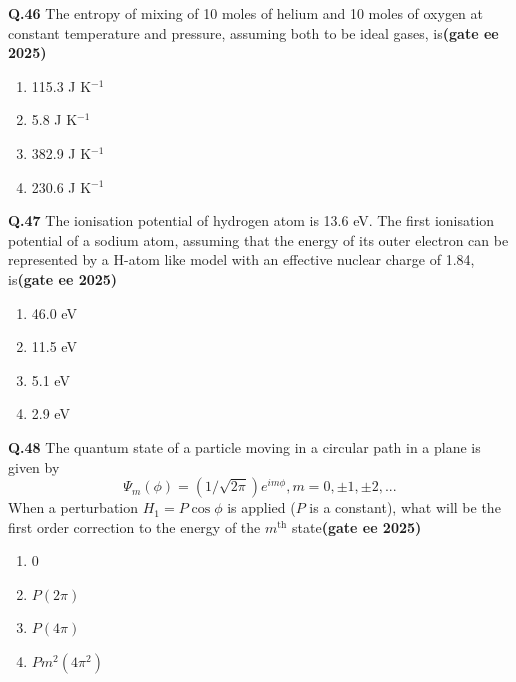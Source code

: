 \documentclass[journal,12pt,onecolumn]{exam}
\theoremstyle{remark}
\begin{document}
\noindent\textbf{Q.46} The entropy of mixing of 10 moles of helium and 10 moles of oxygen at constant temperature and pressure, assuming both to be ideal gases, is\hfill{\textbf{(gate ee 2025)}}
\begin{multicols}{2}
\begin{enumerate}[label=(\Alph*)]
    \item 115.3 J K$^{-1}$
    \item 5.8 J K$^{-1}$
    \item 382.9 J K$^{-1}$
    \item 230.6 J K$^{-1}$
\end{enumerate}
\end{multicols}

\noindent\textbf{Q.47} The ionisation potential of hydrogen atom is 13.6 eV. The first ionisation potential of a sodium atom, assuming that the energy of its outer electron can be represented by a H-atom like model with an effective nuclear charge of 1.84, is\hfill{\textbf{(gate ee 2025)}}
\begin{multicols}{2}
\begin{enumerate}[label=(\Alph*)]
    \item 46.0 eV
    \item 11.5 eV
    \item 5.1 eV
    \item 2.9 eV
\end{enumerate}
\end{multicols}

\noindent\textbf{Q.48} The quantum state of a particle moving in a circular path in a plane is given by
\[
\Psi_{m}(\phi) = (1/\sqrt{2\pi})e^{im\phi}, m=0,\pm1,\pm2,...
\]
When a perturbation $H_1 = P \cos \phi$ is applied ($P$ is a constant), what will be the first order correction to the energy of the $m^\text{th}$ state\hfill{\textbf{(gate ee 2025)}}
\begin{multicols}{2}
\begin{enumerate}[label=(\Alph*)]
    \item 0
    \item $P(2\pi)$
    \item $P(4\pi)$
    \item $Pm^2(4\pi^2)$
\end{enumerate}
\end{multicols}
 \vspace{0.5 cm}
\end{document}
